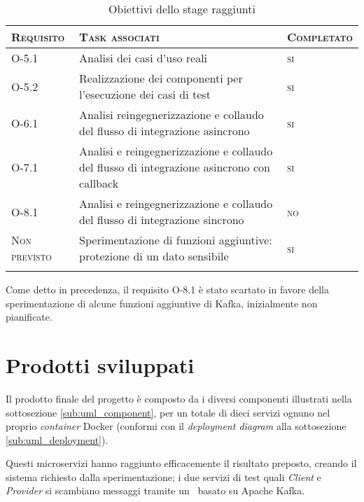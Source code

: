 \onehalfspacing
\begin{small}
  \begin{center}
    \centering
    \renewcommand\arraystretch{1.6}
    \begin{longtable}{| >{\centering\arraybackslash}m{2cm}|m{9.5cm}|>{\centering\arraybackslash}m{2.2cm}|}
      \hline
      \textsc{\textbf{Requisito}} & \textsc{\textbf{Task associati}} & \textsc{\textbf{Completato}} \\
      \hline
      O-5.1 & Analisi dei casi d'uso reali & \textsc{si} \\
      \hline
      O-5.2 & Realizzazione dei componenti per l'esecuzione dei casi di test & \textsc{si}\\
      \Xhline{2\arrayrulewidth}
      O-6.1 & Analisi reingegnerizzazione e collaudo del flusso di integrazione asincrono & \textsc{si} \\
      \Xhline{2\arrayrulewidth}
      O-7.1 & Analisi e reingegnerizzazione e collaudo del flusso di integrazione asincrono con callback & \textsc{si}\\
      \Xhline{2\arrayrulewidth}
      O-8.1 & Analisi e reingegnerizzazione e collaudo del flusso di integrazione sincrono & \textsc{no}\\
      \hline
      \textsc{Non previsto} & Sperimentazione di funzioni aggiuntive: protezione di un dato sensibile & \textsc{si}\\
      \hline

      \caption{Obiettivi dello stage raggiunti}
    \end{longtable}
  \end{center}
\end{small}
\doublespacing

Come detto in precedenza, il requisito O-8.1 è stato scartato in favore della sperimentazione di alcune funzioni aggiuntive di Kafka, inizialmente non pianificate.

\section{Prodotti sviluppati}

Il prodotto finale del progetto è composto da i diversi componenti illustrati nella sottosezione \ref{sub:uml_component}, per un totale di dieci servizi ognuno nel proprio
\textit{container} Docker (conformi con il \textit{deployment diagram} alla sottosezione \ref{sub:uml_deployment}).

Questi microservizi hanno raggiunto efficacemente il risultato preposto, creando il sistema richiesto dalla sperimentazione; i due servizi di test quali  \textit{Client} e  \textit{Provider} si scambiano messaggi tramite un \middleware\ basato su Apache Kafka.


